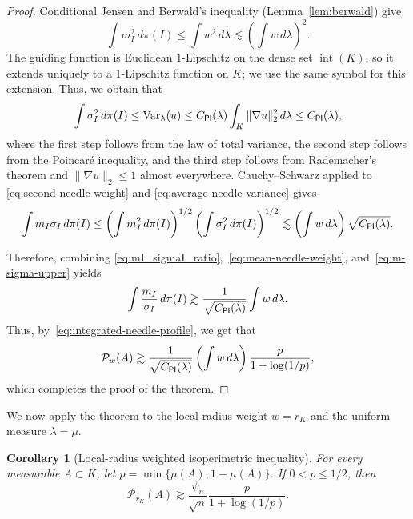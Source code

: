 \documentclass[11pt]{article}
\newtheorem{corollary}[theorem]{Corollary}
\theoremstyle{definition}
\theoremstyle{remark}
\newcommand{\cP}{\mathcal P}
\newcommand{\rK}{r_K}
\begin{document}
\begin{proof}
Conditional Jensen and Berwald's inequality (Lemma~\ref{lem:berwald}) give
\begin{equation}\label{eq:second-needle-weight}
 \int m_I^2\,d\pi(I)
 \le\int w^2\,d\lambda
 \lesssim \left(\int w\,d\lambda\right)^2.
\end{equation}
The guiding function is Euclidean \(1\)-Lipschitz on the dense set
\({\operatorname{int}(K)}\), so it extends uniquely to a \(1\)-Lipschitz function on \(K\);
we use the same symbol for this extension. Thus, we obtain that 
\begin{equation}\label{eq:average-needle-variance}
 \int\sigma_I^2\,d\pi(I)
 \le\operatorname{Var}_\lambda(u)
 \le C_{\sf PI}(\lambda)\int_K\|\nabla u\|_2^2\,d\lambda
 \le C_{\sf PI}(\lambda),
\end{equation}
where the first step follows from the law of total variance, the second step follows from the Poincar\'e inequality, and the third step follows from  Rademacher's theorem and $\|\nabla u\|_2\le1$ almost everywhere. Cauchy--Schwarz applied to \eqref{eq:second-needle-weight} and
\eqref{eq:average-needle-variance} gives
\begin{equation}\label{eq:m-sigma-upper}
 \int m_I\sigma_I\,d\pi(I) \leq \left(\int m_I^2\,d\pi(I)\right)^{1/2}\left(\int \sigma_I^2 \,d\pi(I)\right)^{1/2}
 \lesssim \left(\int w\,d\lambda\right)
       \sqrt{C_{\sf PI}(\lambda)}.
\end{equation}

Therefore, combining \eqref{eq:mI_sigmaI_ratio},~\eqref{eq:mean-needle-weight}, and~\eqref{eq:m-sigma-upper} yields
\begin{equation}\label{eq:ratio-average}
 \int\frac{m_I}{\sigma_I}\,d\pi(I)
 \gtrsim
 \frac1{\sqrt{C_{\sf PI}(\lambda)}}\int w\,d\lambda.
\end{equation}
Thus, by~\eqref{eq:integrated-needle-profile}, we get that
\begin{align*}
    \cP_w(A) \gtrsim\frac1{\sqrt{C_{\sf PI}(\lambda)}}\left(\int w\,d\lambda\right)
 \frac{p}{1+\log(1/p)},
\end{align*}
which completes the proof of the theorem.
\end{proof}

We now apply the theorem to the local-radius weight $w=\rK$ and the uniform measure $\lambda = \mu$.

\begin{corollary}[Local-radius weighted isoperimetric inequality]\label{cor:full-depth}
For every measurable $A\subset K$, let
$p=\min\{\mu(A),1-\mu(A)\}$.  If $0<p\le1/2$, then
\begin{equation}\label{eq:full-depth-profile}
 \cP_{\rK}(A)
 \gtrsim
 \frac{\psi_n}{\sqrt n}
 \frac{p}{1+\log(1/p)}.
\end{equation}
\end{corollary}
\end{document}
